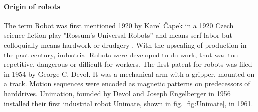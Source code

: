 \paragraph{Origin of robots}
The term \gls{Robot} was first mentioned 1920 by Karel \v{C}apek in a  1920 Czech science ﬁction play "Rossum’s Universal Robots” and means serf labor but colloquially means hardwork or drudgery \cite{CorkeRoboticVisionControl}. With the upscaling of production in the past century, industrial \glspl{Robot} were developed to do work, that was too repetitive, dangerous or difficult for workers. The first patent for robots was filed in 1954 by George C. Devol. It was a mechanical arm with a gripper, mounted on a track. Motion sequences were encoded as magnetic patterns on predecessors of harddrives. Unimation, founded by Devol and Joseph Engelberger in 1956 installed their first industrial robot Unimate, shown in fig. \ref{fig:Unimate}, in 1961.



